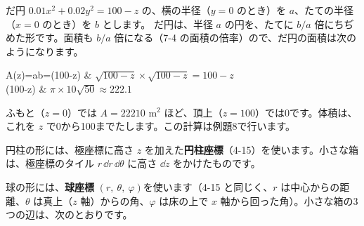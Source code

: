 だ円 $0.01x^2+0.02y^2=100-z$ の、横の半径（$y=0$ のとき）を $a$、たての半径（$x=0$ のとき）を $b$ とします。
だ円は、半径 $a$ の円を、たてに $b/a$ 倍にちぢめた形です。面積も $b/a$ 倍になる（7-4 の面積の倍率）ので、だ円の面積は次のようになります。
\begin{bkhenkei}[0.5]
A(z)=\pi ab=\pi{}\times(100-z) & $\sqrt{100-z}\times\sqrt{100-z}=100-z$ \\
\times(100-z) & $\pi\times10\sqrt{50}\approx222.1$ \\
\end{bkhenkei}
ふもと（$z=0$）では $A=\num{22210}$ m$^2$ ほど、頂上（$z=100$）では0です。体積は、これを $z$ で0から100までたします。この計算は例題8で行います。

円柱の形には、極座標に高さ $z$ を加えた\textbf{円柱座標}（4-15）を使います。小さな箱は、極座標のタイル $r\,\dd r\,\dd\theta$ に高さ $\dd z$ をかけたものです。

球の形には、\textbf{球座標} $(r,\ \theta,\ \varphi)$を使います（4-15 と同じく、$r$ は中心からの距離、$\theta$ は真上（$z$ 軸）からの角、$\varphi$ は床の上で $x$ 軸から回った角）。小さな箱の3つの辺は、次のとおりです。

